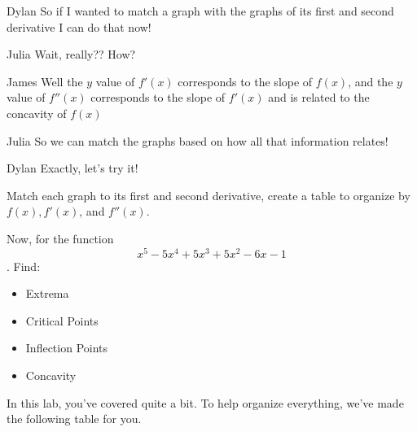 \documentclass{ximera}
\begin{document}
\begin{dialogue}
\item[Dylan]So if I wanted to match a graph with the graphs of its first and second derivative I can do that now!
\item[Julia] Wait, really?? How?
\item[James] Well the $y$ value of $f'(x)$ corresponds to the slope of $f(x)$, and the $y$ value of $f''(x)$ corresponds to the slope of $f'(x)$ and is related to the concavity of $f(x)$
\item[Julia] So we can match the graphs based on how all that information relates!
\item{Dylan} Exactly, let's try it!
\end{dialogue}
Match each graph to its first and second derivative, create a table to organize by $f(x),f'(x)$, and $f''(x)$.

Now, for the function $$x^5-5x^4+5x^3+5x^2-6x-1$$. Find:
\begin{itemize}
\item{Extrema}
\item{Critical Points}
\item{Inflection Points}
\item{Concavity}
\end{itemize}


In this lab, you've covered quite a bit. To help organize everything, we've made the following table for you.
\end{document}
